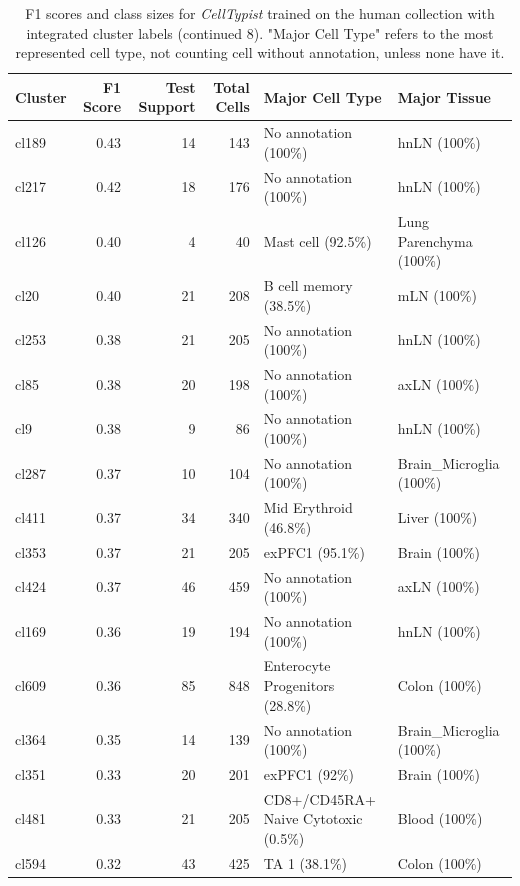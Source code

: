 \begin{table}[ht!]
\scriptsize
\caption[F1 scores and class sizes for \textit{CellTypist} trained on the human collection with integrated cluster labels (continued 8)]{F1 scores and class sizes for \textit{CellTypist} trained on the human collection with integrated cluster labels (continued 8). "Major Cell Type" refers to the most represented cell type, not counting cell without annotation, unless none have it.}
\centering
\label{table:tab_HAmodelclust8}
\begin{tabular}{lrrrll}
  \toprule
Cluster & F1 Score & Test Support & Total Cells & Major Cell Type & Major Tissue \\ 
  \midrule  
  cl189 & 0.43 &  14 & 143 & No annotation (100\%) & hnLN (100\%) \\ 
  cl217 & 0.42 &  18 & 176 & No annotation (100\%) & hnLN (100\%) \\ 
  cl126 & 0.40 &   4 &  40 & Mast cell (92.5\%) & Lung Parenchyma (100\%) \\ 
  cl20 & 0.40 &  21 & 208 & B cell memory (38.5\%) & mLN (100\%) \\ 
  cl253 & 0.38 &  21 & 205 & No annotation (100\%) & hnLN (100\%) \\ 
  cl85 & 0.38 &  20 & 198 & No annotation (100\%) & axLN (100\%) \\ 
  cl9 & 0.38 &   9 &  86 & No annotation (100\%) & hnLN (100\%) \\ 
  cl287 & 0.37 &  10 & 104 & No annotation (100\%) & Brain\_Microglia (100\%) \\ 
  cl411 & 0.37 &  34 & 340 & Mid Erythroid (46.8\%) & Liver (100\%) \\ 
  cl353 & 0.37 &  21 & 205 & exPFC1 (95.1\%) & Brain (100\%) \\ 
  cl424 & 0.37 &  46 & 459 & No annotation (100\%) & axLN (100\%) \\ 
  cl169 & 0.36 &  19 & 194 & No annotation (100\%) & hnLN (100\%) \\ 
  cl609 & 0.36 &  85 & 848 & Enterocyte Progenitors (28.8\%) & Colon (100\%) \\ 
  cl364 & 0.35 &  14 & 139 & No annotation (100\%) & Brain\_Microglia (100\%) \\ 
  cl351 & 0.33 &  20 & 201 & exPFC1 (92\%) & Brain (100\%) \\ 
  cl481 & 0.33 &  21 & 205 & \specialcell[t]{CD8+/CD45RA+\\Naive Cytotoxic (0.5\%)} & Blood (100\%) \\ 
  cl594 & 0.32 &  43 & 425 & TA 1 (38.1\%) & Colon (100\%) \\ 

\end{tabular}
\end{table}
